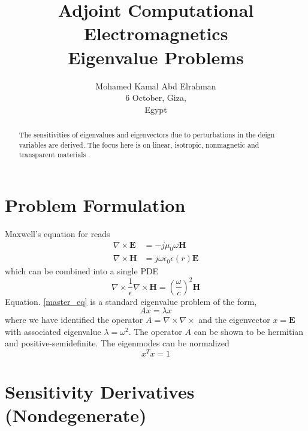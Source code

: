 \documentclass{tufte-handout}
\title{ Adjoint Computational Electromagnetics \\ 
Eigenvalue Problems	}
\author[mohamedkamal]{Mohamed Kamal Abd Elrahman \\
6 October, Giza,\\ Egypt}
\begin{document}
	\maketitle

\begin{abstract}
	The sensitivities of eigenvalues and eigenvectors due to perturbations in the deign variables are derived. The focus here is on linear, isotropic, nonmagnetic and transparent materials . 
\end{abstract}
 \section{Problem Formulation}
Maxwell's equation for  reads 
\begin{subequations}
	\begin{align}
	\nabla \times \mathbf{E}  &= -j \mu_0  \omega \mathbf{H}\\
	\nabla \times \mathbf{H}  &=   j \omega \epsilon_0 \epsilon(r) \mathbf{E}
	\end{align}
\end{subequations}
which can be combined into a single PDE  
\begin{equation}\label{master_eq}
\nabla \times \frac{1}{\epsilon} \nabla \times \mathbf{H}   = \left(  \frac{\omega}{c}\right)^2 \mathbf{H}
\end{equation}
Equation. \ref{master_eq} is a standard eigenvalue problem of the form,
\begin{equation}
A x = \lambda x
\end{equation}
where we have identified the operator $A = \nabla \times \nabla \times  $ and the eigenvector  $x = \mathbf{E}$ with associated eigenvalue $\lambda = \omega^2$. The operator $A$  can be shown to be hermitian and positive-semidefinite. The eigenmodes can be normalized
\begin{equation}
x^T x = 1
\end{equation}
\section{Sensitivity Derivatives (Nondegenerate)}
\end{document}
